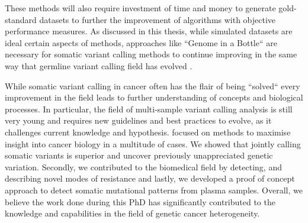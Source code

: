 These methods will also require investment of time and money to generate gold-standard datasets to further the improvement of algorithms with objective performance measures. As discussed in this thesis, while simulated datasets are ideal  certain aspects of methods, approaches like ``Genome in a Bottle`` are necessary for somatic variant calling methods to continue improving in the same way that germline variant calling field has evolved \cite{ValleInclan2022}.

While somatic variant calling in cancer often has the flair of being ``solved`` every improvement in the field leads to further understanding of concepts and biological processes. In particular, the field of multi-sample variant calling analysis is still very young and requires new guidelines and best practices to evolve, as it challenges current knowledge and hypothesis.  focused on methods to maximise insight into cancer biology in a multitude of cases. We showed that jointly calling somatic variants is superior and  uncover previously unappreciated genetic variation. Secondly, we contributed to the biomedical field by detecting, and describing novel modes of resistance and lastly, we developed a proof of concept approach to detect somatic mutational patterns from plasma samples. Overall, we believe the work done during this PhD has significantly contributed to the knowledge and capabilities in the field of genetic cancer heterogeneity.

